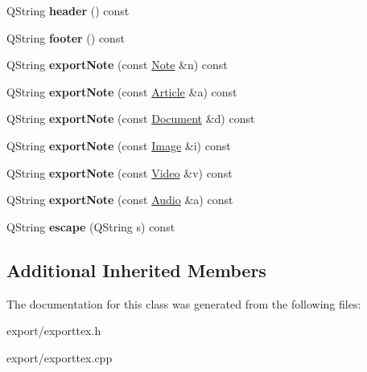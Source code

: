 \begin{DoxyCompactItemize}
\item 
\hypertarget{class_export_tex_a74aeda583fe67a815f3be774027d9dd3}{Q\-String {\bfseries header} () const }\label{class_export_tex_a74aeda583fe67a815f3be774027d9dd3}

\item 
\hypertarget{class_export_tex_a49c5a626ceeb3ba5dbf8e7f052dff386}{Q\-String {\bfseries footer} () const }\label{class_export_tex_a49c5a626ceeb3ba5dbf8e7f052dff386}

\item 
\hypertarget{class_export_tex_a840506a554a202df1365606b61c735b6}{Q\-String {\bfseries export\-Note} (const \hyperlink{class_note}{Note} \&n) const }\label{class_export_tex_a840506a554a202df1365606b61c735b6}

\item 
\hypertarget{class_export_tex_a1a39b17af811055edf03d7c8d004c8d2}{Q\-String {\bfseries export\-Note} (const \hyperlink{class_article}{Article} \&a) const }\label{class_export_tex_a1a39b17af811055edf03d7c8d004c8d2}

\item 
\hypertarget{class_export_tex_a1a7b210d36be9cf55570813101c799e4}{Q\-String {\bfseries export\-Note} (const \hyperlink{class_document}{Document} \&d) const }\label{class_export_tex_a1a7b210d36be9cf55570813101c799e4}

\item 
\hypertarget{class_export_tex_a492795f137a5989d5477122a5477525c}{Q\-String {\bfseries export\-Note} (const \hyperlink{class_image}{Image} \&i) const }\label{class_export_tex_a492795f137a5989d5477122a5477525c}

\item 
\hypertarget{class_export_tex_a24cc7b19b3f024ef8964fb565fb6c527}{Q\-String {\bfseries export\-Note} (const \hyperlink{class_video}{Video} \&v) const }\label{class_export_tex_a24cc7b19b3f024ef8964fb565fb6c527}

\item 
\hypertarget{class_export_tex_a95a601ea067ad1b415ac10032c93718a}{Q\-String {\bfseries export\-Note} (const \hyperlink{class_audio}{Audio} \&a) const }\label{class_export_tex_a95a601ea067ad1b415ac10032c93718a}

\item 
\hypertarget{class_export_tex_ab72958df82e847a4fc204f595a54f901}{Q\-String {\bfseries escape} (Q\-String s) const }\label{class_export_tex_ab72958df82e847a4fc204f595a54f901}

\end{DoxyCompactItemize}
\subsection*{Additional Inherited Members}


The documentation for this class was generated from the following files\-:\begin{DoxyCompactItemize}
\item 
export/exporttex.\-h\item 
export/exporttex.\-cpp\end{DoxyCompactItemize}
